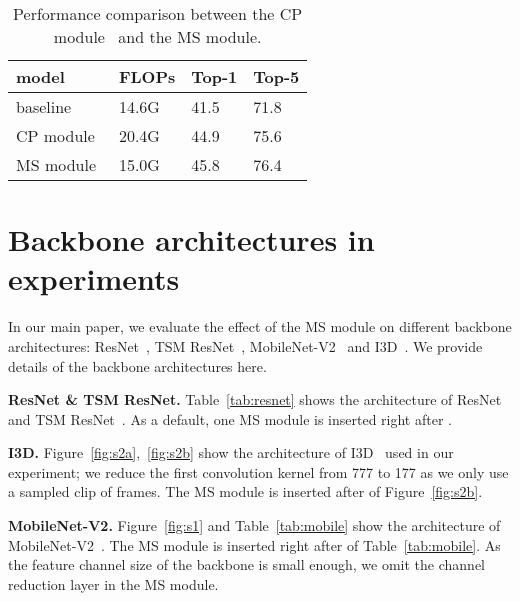 \documentclass[runningheads]{llncs}
\begin{document}
\begin{table}[t]
	\centering
	\caption{Performance comparison between the CP module~\cite{liu2019learning} and the MS module.
		}
	\label{table:cp}
    \begin{tabular}[t]{L{2.5cm}|C{1.2cm}|C{1.2cm}|C{1.2cm}}  
    \toprule
    model & FLOPs & Top-1 & Top-5 \\
    \hline
      baseline     & 14.6G     & 41.5 & 71.8    \\
      \hline
      CP module~\cite{liu2019learning}   & 20.4G     & 44.9 & 75.6     \\
      MS module  & 15.0G     & 45.8 & 76.4      \\
      \bottomrule
    \end{tabular}
\end{table}


\section{Backbone architectures in experiments}
In our main paper, we evaluate the effect of the MS module on different backbone architectures: ResNet~\cite{he2016deep}, TSM ResNet~\cite{lin2019tsm}, MobileNet-V2~\cite{sandler2018mobilenetv2} and I3D~\cite{carreira2017quo}.
We provide details of the backbone architectures here.

\smallbreak
\noindent \textbf{ResNet \& TSM ResNet.}
Table~\ref{tab:resnet} shows the architecture of ResNet~\cite{he2016deep} and TSM ResNet~\cite{lin2019tsm}.
As a default, one MS module is inserted right after .

\smallbreak
\noindent \textbf{I3D.}
Figure~\ref{fig:s2a},~\ref{fig:s2b} show the architecture of I3D~\cite{carreira2017quo} used in our experiment; we reduce the first convolution kernel from 777 to 177 as we only use a sampled clip of  frames.
The MS module is inserted after  of Figure~\ref{fig:s2b}.

\smallbreak
\noindent \textbf{MobileNet-V2.}
Figure~\ref{fig:s1} and Table~\ref{tab:mobile} show the architecture of MobileNet-V2~\cite{sandler2018mobilenetv2}.
The MS module is inserted right after  of Table~\ref{tab:mobile}.
As the feature channel size of the backbone is small enough, we omit the channel reduction layer in the MS module. 
\end{document}
